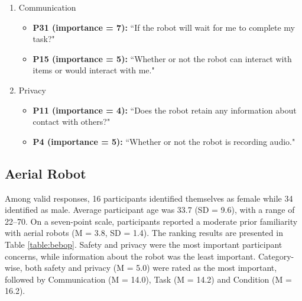 \documentclass[letterpaper, 10 pt, conference]{ieeeconf}  %
\begin{document}
\begin{enumerate}
\item Communication
    \begin{itemize}
    \item  \textbf{P31 (importance = 7):} ``If the robot will wait for me to complete my task?"
    \item  \textbf{P15 (importance = 5):} ``Whether or not the robot can interact with items or would interact with me."
    \end{itemize}
    
\item Privacy
    \begin{itemize}
        \item  \textbf{P11 (importance = 4):} ``Does the robot retain any information about contact with others?"
        \item  \textbf{P4 (importance = 5):} ``Whether or not the robot is recording audio."
    \end{itemize}

\end{enumerate}

\subsection{Aerial Robot}
Among valid responses, 16 participants identified themselves as female while 34 identified as male. Average participant age was 33.7 (SD = 9.6), with a range of 22--70. On a seven-point scale, participants reported a moderate prior familiarity with aerial robots (M = 3.8, SD = 1.4). The ranking results are presented in Table \ref{table:bebop}. Safety and privacy were the most important participant concerns, while information about the robot was the least important. Category-wise, both safety and privacy (M = 5.0) were rated as the most important, followed by Communication (M = 14.0), Task (M = 14.2) and Condition (M = 16.2).
\end{document}
